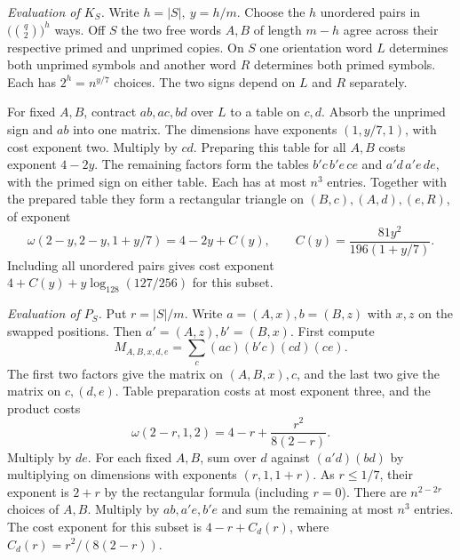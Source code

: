 \documentclass[11pt,letterpaper]{article}
\begin{document}
\emph{Evaluation of \(K_S\).} Write \(h=|S|,\ y=h/m\).
Choose the \(h\) unordered pairs in \(\bigl(\binom q2\bigr)^h\) ways. Off \(S\) the two free words \(A,B\) of length
\(m-h\) agree across their respective primed and unprimed copies.
On \(S\) one orientation word \(L\) determines both unprimed symbols and
another word \(R\) determines both primed symbols. Each has \(2^h=n^{y/7}\)
choices. The two signs depend on \(L\) and \(R\) separately.

For fixed \(A,B\), contract \(ab,ac,bd\) over \(L\) to a table on \(c,d\).
Absorb the unprimed sign and \(ab\) into one matrix. The dimensions have
exponents \((1,y/7,1)\), with cost exponent two. Multiply by \(cd\).
Preparing this table for all \(A,B\) costs exponent \(4-2y\).
The remaining factors form the tables \(b'c\, b'e\,ce\) and \(a'd\, a'e\,de\),
with the primed sign on either table. Each has at most \(n^3\) entries.
Together with the prepared table they form a rectangular triangle on
\((B,c),(A,d),(e,R)\), of exponent
\[
 \omega(2-y,2-y,1+y/7)=4-2y+C(y),\qquad
 C(y)=\frac{81y^2}{196(1+y/7)} .
\]
Including all unordered pairs gives cost exponent
\(4+C(y)+y\log_{128}(127/256)\) for this subset.

\emph{Evaluation of \(P_S\).} Put \(r=|S|/m\).
Write \(a=(A,x), b=(B,z)\) with \(x,z\) on the swapped positions.
Then \(a'=(A,z), b'=(B,x)\). First compute
\[
 M_{A,B,x,d,e}=\sum_c (ac)(b'c)(cd)(ce).
\]
The first two factors give the matrix on \((A,B,x),c\), and the last two
give the matrix on \(c,(d,e)\). Table preparation costs at most exponent
three, and the product costs
\[
 \omega(2-r,1,2)=4-r+\frac{r^2}{8(2-r)} .
\]
Multiply by \(de\). For each fixed \(A,B\), sum over \(d\) against
\((a'd)(bd)\) by multiplying on dimensions with exponents \((r,1,1+r)\).
As \(r\le1/7\), their exponent is \(2+r\) by the rectangular formula
(including \(r=0\)). There are \(n^{2-2r}\) choices of \(A,B\).
Multiply by \(ab,a'e,b'e\) and sum the remaining at most \(n^3\) entries.
The cost exponent for this subset is \(4-r+C_d(r)\), where
\(C_d(r)=r^2/(8(2-r))\).
\end{document}
